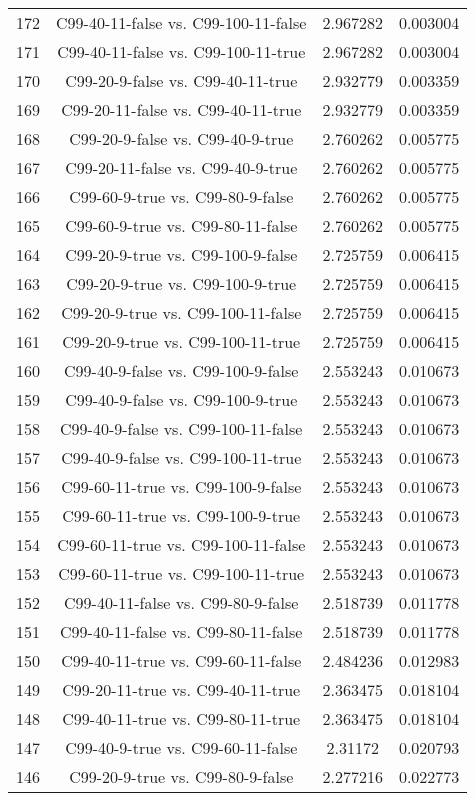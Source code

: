 \documentclass[a4paper,10pt]{article}
\begin{document}
\begin{landscape}
\begin{table}[!htp]
\begin{tabular}{cccc}
172&C99-40-11-false vs. C99-100-11-false&2.967282&0.003004\\
171&C99-40-11-false vs. C99-100-11-true&2.967282&0.003004\\
170&C99-20-9-false vs. C99-40-11-true&2.932779&0.003359\\
169&C99-20-11-false vs. C99-40-11-true&2.932779&0.003359\\
168&C99-20-9-false vs. C99-40-9-true&2.760262&0.005775\\
167&C99-20-11-false vs. C99-40-9-true&2.760262&0.005775\\
166&C99-60-9-true vs. C99-80-9-false&2.760262&0.005775\\
165&C99-60-9-true vs. C99-80-11-false&2.760262&0.005775\\
164&C99-20-9-true vs. C99-100-9-false&2.725759&0.006415\\
163&C99-20-9-true vs. C99-100-9-true&2.725759&0.006415\\
162&C99-20-9-true vs. C99-100-11-false&2.725759&0.006415\\
161&C99-20-9-true vs. C99-100-11-true&2.725759&0.006415\\
160&C99-40-9-false vs. C99-100-9-false&2.553243&0.010673\\
159&C99-40-9-false vs. C99-100-9-true&2.553243&0.010673\\
158&C99-40-9-false vs. C99-100-11-false&2.553243&0.010673\\
157&C99-40-9-false vs. C99-100-11-true&2.553243&0.010673\\
156&C99-60-11-true vs. C99-100-9-false&2.553243&0.010673\\
155&C99-60-11-true vs. C99-100-9-true&2.553243&0.010673\\
154&C99-60-11-true vs. C99-100-11-false&2.553243&0.010673\\
153&C99-60-11-true vs. C99-100-11-true&2.553243&0.010673\\
152&C99-40-11-false vs. C99-80-9-false&2.518739&0.011778\\
151&C99-40-11-false vs. C99-80-11-false&2.518739&0.011778\\
150&C99-40-11-true vs. C99-60-11-false&2.484236&0.012983\\
149&C99-20-11-true vs. C99-40-11-true&2.363475&0.018104\\
148&C99-40-11-true vs. C99-80-11-true&2.363475&0.018104\\
147&C99-40-9-true vs. C99-60-11-false&2.31172&0.020793\\
146&C99-20-9-true vs. C99-80-9-false&2.277216&0.022773\\

\end{tabular}
\end{table}
\end{landscape}
\end{document}
